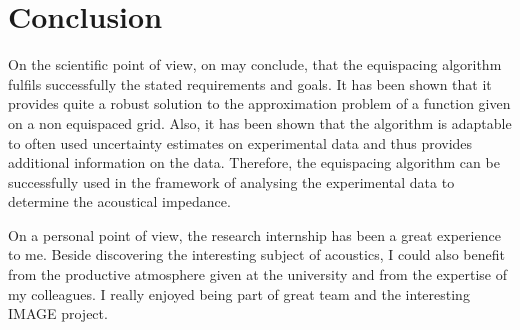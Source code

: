 \documentclass[11pt]{report} %
\begin{document}
\section{Conclusion}
On the scientific point of view, on may conclude, that the equispacing algorithm fulfils successfully the stated requirements and goals.
It has been shown that it provides quite a robust solution to the approximation problem of a function given on a non equispaced grid. 
Also, it has been shown that the algorithm is adaptable to often used uncertainty estimates on experimental data and thus provides additional information on the data.  
Therefore, the equispacing algorithm can be successfully used in the framework of analysing the experimental data to determine the acoustical impedance. 

On a personal point of view, the research internship has been a great experience to me.
Beside discovering the interesting subject of acoustics, I could also benefit from the productive atmosphere given at the university and from the expertise of my colleagues. 
I really enjoyed being part of great team and the interesting IMAGE project. 
  
\end{document}
